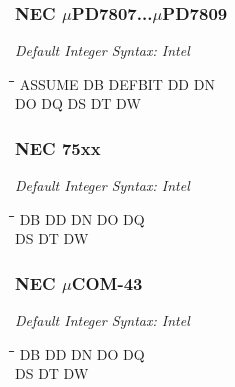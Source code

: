 \subsubsection{NEC $\mu$PD7807...$\mu$PD7809}

{\em Default Integer Syntax: Intel}

{\tt\begin{tabbing}
\hspace{3cm}\=\hspace{3cm}\=\hspace{3cm}\=\hspace{3cm}\=\kill
ASSUME     \> DB          \> DEFBIT      \>DD          \> DN \\
DO         \> DQ          \> DS          \> DT         \> DW \\
\end{tabbing}}

\subsubsection{NEC 75xx}

{\em Default Integer Syntax: Intel}

{\tt\begin{tabbing}
\hspace{3cm}\=\hspace{3cm}\=\hspace{3cm}\=\hspace{3cm}\=\kill
DB         \> DD          \> DN          \> DO         \> DQ \\
DS         \> DT          \> DW \\
\end{tabbing}}

\subsubsection{NEC $\mu$COM-43}

{\em Default Integer Syntax: Intel}

{\tt\begin{tabbing}
\hspace{3cm}\=\hspace{3cm}\=\hspace{3cm}\=\hspace{3cm}\=\kill
DB         \> DD          \> DN          \> DO         \> DQ \\
DS         \> DT          \> DW \\
\end{tabbing}}

